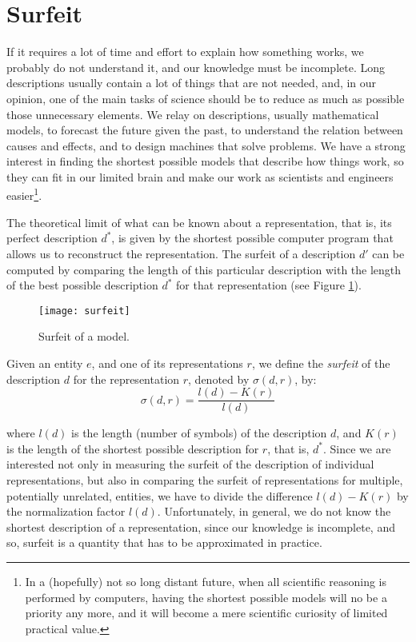 %
%

\section{Surfeit}
\label{sec:ch1_surfeit}

If it requires a lot of time and effort to explain how something works, we probably do not understand it, and our knowledge must be incomplete. Long descriptions usually contain a lot of things that are not needed, and, in our opinion, one of the main tasks of science should be to reduce as much as possible those unnecessary elements. We relay on descriptions, usually mathematical models, to forecast the future given the past, to understand the relation between causes and effects, and to design machines that solve problems. We have a strong interest in finding the shortest possible models that describe how things work, so they can fit in our limited brain and make our work as scientists and engineers easier\footnote{In a (hopefully) not so long distant future, when all scientific reasoning is performed by computers, having the shortest possible models will no be a priority any more, and it will become a mere scientific curiosity of limited practical value.}.

The theoretical limit of what can be known about a representation, that is, its perfect description $d^\ast$, is given by the shortest possible computer program that allows us to reconstruct the representation. The surfeit of a description $d'$ can be computed by comparing the length of this particular description with the length of the best possible description $d^\ast$ for that representation (see Figure \ref{fig:intro-surfeit}).

\begin{figure}[h]
\centering\texttt{[image: surfeit]}
\caption{\label{fig:intro-surfeit}Surfeit of a model.}
\end{figure}

Given an entity $e$, and one of its representations $r$, we define the \emph{surfeit} of the description $d$ for the representation $r$, denoted by $\sigma(d, r)$, by:
\[
\sigma\left(d, r\right) = \frac{l \left(d\right) - K(r)}{l \left(d\right)}
\]

where $l \left(d\right)$ is the length (number of symbols) of the description $d$, and $K(r)$ is the length of the shortest possible description for $r$, that is, $d^\ast$. Since we are interested not only in measuring the surfeit of the description of individual representations, but also in comparing the surfeit of representations for multiple, potentially unrelated, entities, we have to divide the difference $l \left(d\right) - K(r)$ by the normalization factor $l \left(d\right)$. Unfortunately, in general, we do not know the shortest description of a representation, since our knowledge is incomplete, and so, surfeit is a quantity that has to be approximated in practice.

